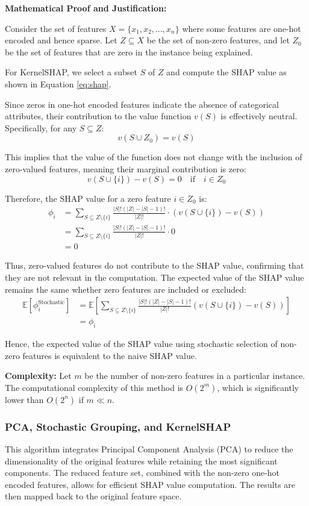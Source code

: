 \textbf{Mathematical Proof and Justification:}

Consider the set of features $X = \{x_1, x_2, \ldots, x_n\}$ where some features are one-hot encoded and hence sparse. Let $Z \subseteq X$ be the set of non-zero features, and let $Z_0$ be the set of features that are zero in the instance being explained.

For KernelSHAP, we select a subset $S$ of $Z$ and compute the SHAP value as shown in Equation \ref{eq:shap}.

Since zeros in one-hot encoded features indicate the absence of categorical attributes, their contribution to the value function $v(S)$ is effectively neutral. Specifically, for any $S \subseteq Z$:
\[ v(S \cup Z_0) = v(S) \]

This implies that the value of the function does not change with the inclusion of zero-valued features, meaning their marginal contribution is zero:
\[ v(S \cup \{i\}) - v(S) = 0 \quad \text{if} \quad i \in Z_0 \]

Therefore, the SHAP value for a zero feature $i \in Z_0$ is:
\[
\begin{aligned}
\phi_i &= \sum_{S \subseteq Z \setminus \{i\}} \frac{|S|!(|Z| - |S| - 1)!}{|Z|!} \cdot (v(S \cup \{i\}) - v(S)) \\
       &= \sum_{S \subseteq Z \setminus \{i\}} \frac{|S|!(|Z| - |S| - 1)!}{|Z|!} \cdot 0 \\
       &= 0
\end{aligned}
\]

Thus, zero-valued features do not contribute to the SHAP value, confirming that they are not relevant in the computation. The expected value of the SHAP value remains the same whether zero features are included or excluded:
\[
\begin{aligned}
\mathbb{E}[\phi_i^{\text{Stochastic}}] &= \mathbb{E} \left[ \sum_{S \subseteq Z \setminus \{i\}} \frac{|S|!(|Z| - |S| - 1)!}{|Z|!} (v(S \cup \{i\}) - v(S)) \right] \\
&= \phi_i
\end{aligned}
\]

Hence, the expected value of the SHAP value using stochastic selection of non-zero features is equivalent to the naive SHAP value.

\textbf{Complexity:}
Let $m$ be the number of non-zero features in a particular instance. The computational complexity of this method is $O(2^m)$, which is significantly lower than $O(2^n)$ if $m \ll n$.

\subsubsection{PCA, Stochastic Grouping, and KernelSHAP}
This algorithm integrates Principal Component Analysis (PCA) to reduce the dimensionality of the original features while retaining the most significant components. The reduced feature set, combined with the non-zero one-hot encoded features, allows for efficient SHAP value computation. The results are then mapped back to the original feature space.

